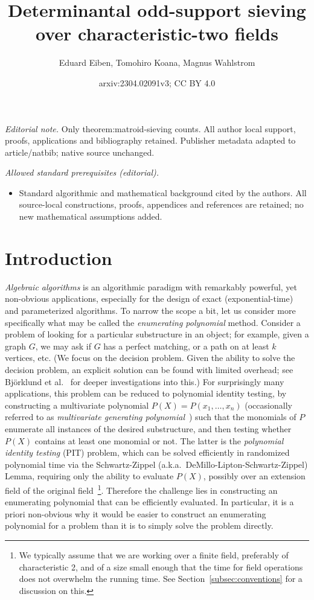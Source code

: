 \documentclass[10pt,a4paper]{article}
\title{Determinantal odd-support sieving over characteristic-two fields}
\author{Eduard Eiben, Tomohiro Koana, Magnus Wahlstrom}
\date{arxiv:2304.02091v3; CC BY 4.0}
\begin{document}
\maketitle
\noindent\textit{Editorial note.} Only theorem:matroid-sieving counts. All author local support, proofs, applications and bibliography retained. Publisher metadata adapted to article/natbib; native source unchanged.\par\medskip
\noindent\textit{Allowed standard prerequisites (editorial).}\begin{itemize}
\item Standard algorithmic and mathematical background cited by the authors. All source-local constructions, proofs, appendices and references are retained; no new mathematical assumptions added.
\end{itemize}\medskip
\section{Introduction} \label{sec:intro}

\emph{Algebraic algorithms} is an algorithmic paradigm with 
remarkably powerful, yet non-obvious applications, especially for the design of  exact (exponential-time) and
parameterized algorithms. To narrow the scope a bit, let us consider
more specifically what may be called the \emph{enumerating polynomial}
method. Consider a problem of looking for a particular substructure in
an object; for example, given a graph $G$, we may ask if $G$ has a
perfect matching, or a path on at least $k$ vertices, etc. (We
  focus on the decision problem. Given the ability to solve the
  decision problem, an explicit solution can be found with limited
  overhead; see Bj\"orklund et al.~\cite{BjorklundKK14witness,BjorklundKKL15alenex} 
  for deeper investigations into this.)
For surprisingly many applications, this problem can be reduced to
polynomial identity testing, by constructing a multivariate polynomial
$P(X)=P(x_1,\ldots,x_n)$ (occasionally referred to as \emph{multivariate generating polynomial}~\cite{Brand19thesis})
such that the monomials of $P$ enumerate all
instances of the desired substructure, and then testing
whether $P(X)$ contains at least one monomial or not. The latter is
the \emph{polynomial identity testing} (PIT) problem, which can be
solved efficiently in randomized polynomial time via the Schwartz-Zippel
(a.k.a.\ DeMillo-Lipton-Schwartz-Zippel) Lemma, requiring only the ability
to evaluate $P(X)$, possibly over an extension field of the original
field~\cite{Schwartz80,Zippel79}\footnote{We typically assume that we are working over a
  finite field, preferably of characteristic 2, and of a size small enough that the time for field operations does not overwhelm the running time. 
  See Section~\ref{subsec:conventions} for a discussion on this.}.
Therefore the challenge lies in
constructing an enumerating polynomial that can be
efficiently evaluated. In particular, it is a priori non-obvious why
it would be easier to construct an enumerating polynomial for a
problem than it is to simply solve the problem directly. 
\end{document}
